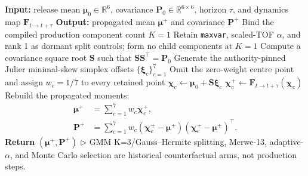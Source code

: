 \begin{minipage}{\linewidth}
\captionsetup{type=algorithm,hypcap=false}
\caption{Production Julier-7 Dust Transform}
\label{alg:mut}
\end{minipage}
\begin{algorithmic}[1]
\State \textbf{Input:} release mean $\boldsymbol{\mu}_0\!\in\!\mathbb{R}^6$, covariance $\boldsymbol{P}_0\!\in\!\mathbb{R}^{6\times6}$, horizon $\tau$, and dynamics map $\boldsymbol{F}_{t\rightarrow t+\tau}$
\State \textbf{Output:} propagated mean $\boldsymbol{\mu}^+$ and covariance $\boldsymbol{P}^+$
\Statex
\State Bind the compiled production component count \(K=1\)
\State Retain \texttt{maxvar}, scaled-TOF \(\alpha\), and rank 1 as dormant split controls; form no child components at \(K=1\)
\State Compute a covariance square root \(\boldsymbol{S}\) such that \(\boldsymbol{S}\boldsymbol{S}^{\top}=\boldsymbol{P}_0\)
\State Generate the authority-pinned Julier minimal-skew simplex offsets \(\{\boldsymbol{\xi}_c\}_{c=1}^{7}\)
\State Omit the zero-weight centre point and assign \(w_c=1/7\) to every retained point
    \State \(\boldsymbol{\chi}_c \gets \boldsymbol{\mu}_0+\boldsymbol{S}\boldsymbol{\xi}_c\)
    \State \(\boldsymbol{\chi}_c^+ \gets \boldsymbol{F}_{t\rightarrow t+\tau}(\boldsymbol{\chi}_c)\)
\EndFor
\State Rebuild the propagated moments:
\begin{align}
    \boldsymbol{\mu}^+ &=
        \sum_{c=1}^{7} w_c\boldsymbol{\chi}_c^+,\\
    \boldsymbol{P}^+ &=
        \sum_{c=1}^{7} w_c
        (\boldsymbol{\chi}_c^+-\boldsymbol{\mu}^+)
        (\boldsymbol{\chi}_c^+-\boldsymbol{\mu}^+)^\top.
\end{align}
\State \textbf{Return} \((\boldsymbol{\mu}^+,\boldsymbol{P}^+)\)
\Statex
\Statex \(\triangleright\) GMM K=3/Gauss--Hermite splitting, Merwe-13, adaptive-\(\alpha\), and Monte Carlo selection are historical counterfactual arms, not production steps.
\end{algorithmic}
